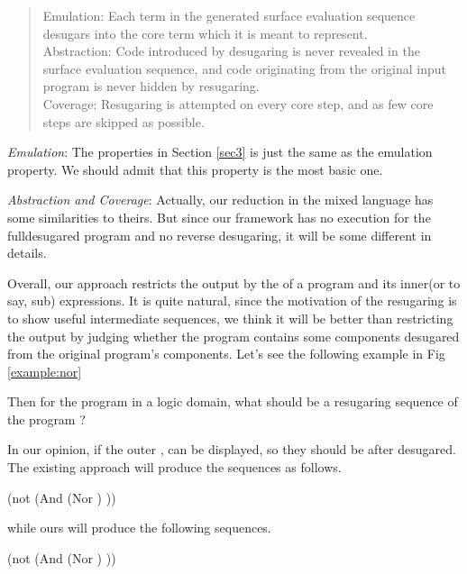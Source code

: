 \begin{quote}
Emulation: 
Each term in the generated surface evaluation sequence desugars into the core term which it is meant to represent.\\
Abstraction: 
Code introduced by desugaring is never revealed in the surface evaluation sequence, and code originating from the original input program is never hidden by resugaring.\\
Coverage: Resugaring is attempted on every core step, and as few core steps are skipped as possible.\\
\end{quote}

\emph{Emulation}: The properties in Section \ref{sec3} is just the same as the emulation property. We should admit that this property is the most basic one.

\emph{Abstraction and Coverage}: Actually, our reduction in the mixed language has some similarities to theirs. But since our framework has no execution for the fulldesugared program and no reverse desugaring, it will be some different in details.

Overall, our approach restricts the output by the  of a program and its inner(or to say, sub) expressions. It is quite natural, since the motivation of the resugaring is to show useful intermediate sequences, we think it will be better than restricting the output by judging whether the program contains some components desugared from the original program's components. Let's see the following example in Fig \ref{example:nor}

Then for the program in a logic domain, what should be a resugaring sequence of the program  ?

In our opinion, if the outer ,  can be displayed, so they should be after desugared.
The existing approach will produce the sequences as follows.
\begin{footnotesize}
\begin{Codes}
    (not (And (Nor \false \true) \true))
\OneStep{ \true}
\end{Codes}
\end{footnotesize}

while ours will produce the following sequences.
\begin{footnotesize}
\begin{Codes}
    (not (And (Nor \false \true) \true))
\OneStep{ \true}
\end{Codes}
\end{footnotesize}


